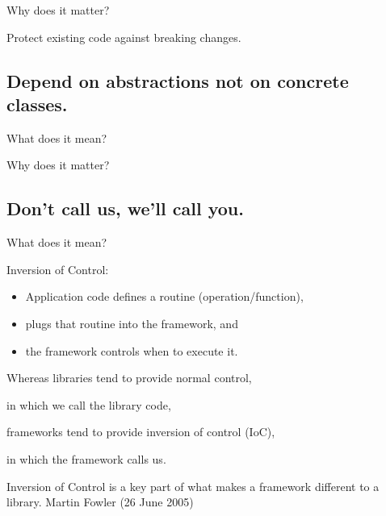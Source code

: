 \documentclass{beamer}
\begin{document}
\begin{frame}{Why does it matter?}
    \par Protect existing code against breaking changes.
\end{frame}

\begin{frame}{}
    
\end{frame}

\begin{frame}{}
    
\end{frame}

\subsection{Depend on abstractions not on concrete classes.}

\begin{frame}{What does it mean?}
\end{frame}

\begin{frame}{Why does it matter?}
\end{frame}

\subsection{Don't call us, we'll call you.}

\begin{frame}{What does it mean?}
    \par Inversion of Control: 
    \begin{itemize}
        \item Application code defines a routine (operation/function),
        \item plugs that routine into the framework, and 
        \item the framework controls when to execute it.
    \end{itemize}
    \par Whereas libraries tend to provide normal control, 
    \par in which we call the library code,
    \par frameworks tend to provide inversion of control (IoC),
    \par in which the framework calls us.
\end{frame}

\begin{frame}
Inversion of Control is a key part of what makes a framework different to a library.
Martin Fowler (26 June 2005)
\end{frame}
\end{document}
